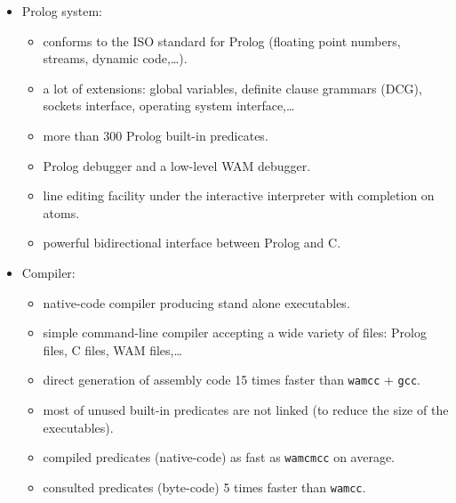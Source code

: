 \begin{itemize}


\item Prolog system:

\begin{itemize}

\item conforms to the ISO standard for Prolog (floating point numbers,
streams, dynamic code,\dots).

\item a lot of extensions: global variables, definite clause grammars (DCG), 
sockets interface, operating system interface,\ldots

\item more than 300 Prolog built-in predicates.

\item Prolog debugger and a low-level WAM debugger.

\item line editing facility under the interactive interpreter with
completion on atoms.

\item powerful bidirectional interface between Prolog and C.

\end{itemize}


\item Compiler:

\begin{itemize}

\item native-code compiler producing stand alone executables.

\item simple command-line compiler accepting a wide variety of files:
Prolog files, C files, WAM files,\ldots

\item direct generation of assembly code 15 times faster than
\texttt{wamcc} + \texttt{gcc}.

\item most of unused built-in predicates are not linked (to reduce the size
of the executables).

\item compiled predicates (native-code) as fast as \texttt{wamcmcc} on average.

\item consulted predicates (byte-code) 5 times faster than \texttt{wamcc}.

\end{itemize}


\end{itemize}
